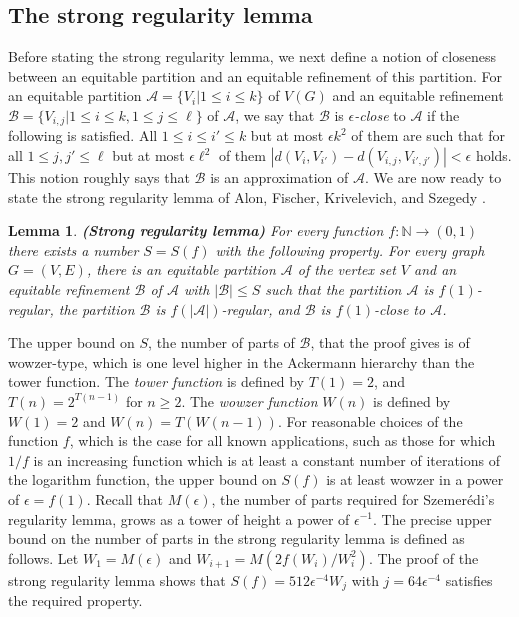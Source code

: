 \documentclass[11pt]{article}
\newtheorem{lemma}{Lemma}[section]
\begin{document}
\subsection{The strong regularity lemma}\label{strongsubsection}


Before stating the strong regularity lemma, we next define a notion of
closeness between an equitable partition and an equitable refinement of this
partition.  For an equitable partition $\mathcal{A} = \{V_i|1 \leq i \leq k\}$
of $V(G)$ and an equitable refinement $\mathcal{B} = \{V_{i,j}|1 \leq i \leq
k,1 \leq j \leq \ell\}$ of $\mathcal{A}$, we say that $\mathcal{B}$ is {\it
$\epsilon$-close} to $\mathcal{A}$ if the following is satisfied. All $1\leq i
\leq i' \leq k$ but at most $\epsilon k^2$ of them are such that for all $1\leq
j,j' \leq \ell$ but at most $\epsilon \ell^2$ of them
$|d(V_i,V_{i'})-d(V_{i,j},V_{i',j'})|<\epsilon$ holds. This notion roughly says
that $\mathcal{B}$ is an approximation of $\mathcal{A}$. We are now ready to state the strong regularity lemma of  Alon, Fischer, Krivelevich, and Szegedy \cite{AFKS}.

\begin{lemma}\label{strongreg} {\bf (Strong regularity lemma)} For every
function $f:\mathbb{N} \rightarrow (0,1)$ there exists a number $S = S(f)$ with
the following property. For every graph $G=(V,E)$, there is an equitable
partition $\mathcal{A}$ of the vertex set $V$ and an equitable refinement
$\mathcal{B}$ of $\mathcal{A}$ with $|\mathcal{B}| \leq S$ such that the
partition $\mathcal{A}$ is $f(1)$-regular, the partition $\mathcal{B}$ is
$f(|\mathcal{A}|)$-regular, and $\mathcal{B}$ is $f(1)$-close to $\mathcal{A}$.
\end{lemma}

The upper bound on $S$, the number of parts of $\mathcal{B}$, that the proof
gives is of wowzer-type, which is one level  higher in the Ackermann hierarchy
than the tower function. The {\it tower function} is defined by $T(1)=2$, and
$T(n)=2^{T(n-1)}$ for $n \geq 2$. The {\it wowzer function} $W(n)$ is defined
by $W(1)=2$ and $W(n)=T(W(n-1))$. For reasonable choices of the function $f$,
which is the case for all known applications, such as those for which $1/f$ is
an increasing function which is at least a constant number of iterations of the
logarithm function, the upper bound on $S(f)$ is at least wowzer in a power of
$\epsilon=f(1)$. Recall that $M(\epsilon)$, the number of parts required for
Szemer\'edi's regularity lemma, grows as a tower of height a power of
$\epsilon^{-1}$. The precise upper bound on the number of parts in the strong
regularity lemma is defined as follows. Let $W_1=M(\epsilon)$ and
$W_{i+1}=M(2f(W_i)/W_i^2)$.
The proof of the strong regularity lemma \cite{AFKS} shows that
$S(f)=512\epsilon^{-4}W_j$ with $j= 64\epsilon^{-4}$ satisfies the required
property.
\end{document}
